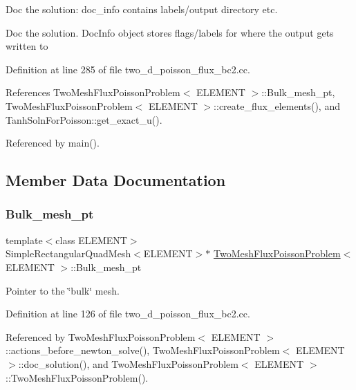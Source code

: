 Doc the solution\+: doc\+\_\+info contains labels/output directory etc. 

Doc the solution. Doc\+Info object stores flags/labels for where the output gets written to 

Definition at line 285 of file two\+\_\+d\+\_\+poisson\+\_\+flux\+\_\+bc2.\+cc.



References Two\+Mesh\+Flux\+Poisson\+Problem$<$ E\+L\+E\+M\+E\+N\+T $>$\+::\+Bulk\+\_\+mesh\+\_\+pt, Two\+Mesh\+Flux\+Poisson\+Problem$<$ E\+L\+E\+M\+E\+N\+T $>$\+::create\+\_\+flux\+\_\+elements(), and Tanh\+Soln\+For\+Poisson\+::get\+\_\+exact\+\_\+u().



Referenced by main().



\subsection{Member Data Documentation}
\mbox{\label{classTwoMeshFluxPoissonProblem_abd0718261b6c8586d5de35cfef2292d8}} 
\subsubsection{\texorpdfstring{Bulk\+\_\+mesh\+\_\+pt}{Bulk\_mesh\_pt}}
{\footnotesize\ttfamily template$<$class E\+L\+E\+M\+E\+NT$>$ \\
Simple\+Rectangular\+Quad\+Mesh$<$E\+L\+E\+M\+E\+NT$>$$\ast$ \hyperlink{classTwoMeshFluxPoissonProblem}{Two\+Mesh\+Flux\+Poisson\+Problem}$<$ E\+L\+E\+M\+E\+NT $>$\+::Bulk\+\_\+mesh\+\_\+pt\hspace{0.3cm}{\ttfamily [private]}}



Pointer to the \char`\"{}bulk\char`\"{} mesh. 



Definition at line 126 of file two\+\_\+d\+\_\+poisson\+\_\+flux\+\_\+bc2.\+cc.



Referenced by Two\+Mesh\+Flux\+Poisson\+Problem$<$ E\+L\+E\+M\+E\+N\+T $>$\+::actions\+\_\+before\+\_\+newton\+\_\+solve(), Two\+Mesh\+Flux\+Poisson\+Problem$<$ E\+L\+E\+M\+E\+N\+T $>$\+::doc\+\_\+solution(), and Two\+Mesh\+Flux\+Poisson\+Problem$<$ E\+L\+E\+M\+E\+N\+T $>$\+::\+Two\+Mesh\+Flux\+Poisson\+Problem().

